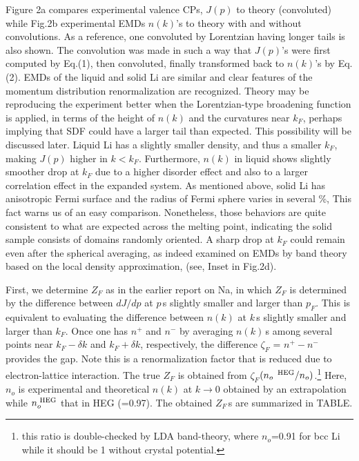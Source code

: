 \documentclass[twocolumn,showpacs,showkeys,fleqn,prl,superscriptaddress]{revtex4}%
\newcommand{\nn}[1]{\textnormal{ #1}}
\begin{document}
Figure 2a compares experimental valence CPs, $J(p)$ to theory (convoluted) while Fig.2b experimental EMDs $n(k)$’s to theory with and without convolutions. 
As a reference, one convoluted by Lorentzian having longer tails is also shown. 
The convolution was made in such a way that $J(p)$’s were first computed by Eq.(1), then convoluted, finally transformed back to $n(k)$’s by Eq. (2). 
EMDs of the liquid and solid Li are similar and clear features of the momentum distribution renormalization are recognized.  
Theory may be reproducing the experiment better when the Lorentzian-type broadening function is applied, in terms of the height of $n(k)$ and the curvatures near $k_F$, perhaps implying that SDF could have a larger tail than expected.
This possibility will be discussed later. 
Liquid Li has a slightly smaller density, and thus a smaller $k_F$, making $J(p)$ higher in $k < k_F$.
Furthermore, $n(k)$ in liquid shows slightly smoother drop at $ k_F $ due to a higher disorder effect and also to a larger correlation effect in the expanded system.
As mentioned above, solid Li has anisotropic Fermi surface and the radius of Fermi sphere varies in several \%\cite{saku95,schulke96}, This fact warns us of an easy comparison.
Nonetheless, those behaviors are quite consistent to what are expected across the melting point, indicating the solid sample consists of domains randomly oriented. 
A sharp drop at $k_F$ could remain even after the spherical averaging, as indeed examined on EMDs by band theory based on the local density approximation, (see, Inset in Fig.2d). 


First, we determine $Z_F$ as in the earlier report on Na\cite{simo10}, in which $Z_F$ is determined by the difference between $dJ/dp$ at $p\,$s slightly smaller and larger than $p_F$. 
This is equivalent to evaluating the difference between $n(k)$ at $k\,$s slightly smaller and larger than $k_F$.
Once one has $n^+$ and $n^-$ by averaging $n(k)$\,s among several points near $k_F-\delta k$ and  $k_F+\delta k$, respectively, the difference $\zeta_F$ = $n^+ - n^-$ provides the gap. 
Note this is a renormalization factor that is reduced due to electron-lattice interaction. 
The true $Z_F$ is obtained from $\zeta_F$$(n_o\,^{\nn{HEG}}/n_o) $.\footnote{this ratio is double-checked by LDA band-theory, where $n_o$=0.91 for bcc Li while it should be 1 without crystal potential.}  
Here, $n_o$ is experimental and theoretical $n(k)$ at $k \to 0$ obtained by an extrapolation while $n_o^{\nn{HEG}}$ that in HEG (=0.97). 
The obtained $Z_F\,$s are summarized in TABLE.
\end{document}
